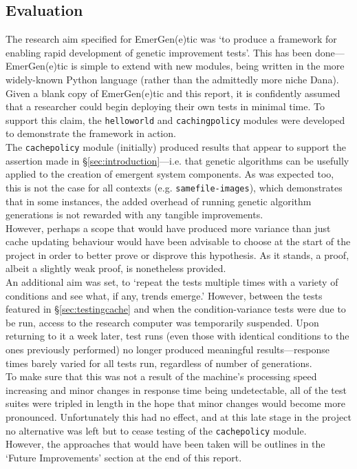 \documentclass[compsoc,12pt,a4paper]{IEEEtran}
\begin{document}
		\subsection{Evaluation}
		\label{sec:eval}
			
			The research aim specified for EmerGen(e)tic was `to produce a framework for enabling rapid development of genetic improvement tests'. This has been done---EmerGen(e)tic is simple to extend with new modules, being written in the more widely-known Python language (rather than the admittedly more niche Dana). Given a blank copy of EmerGen(e)tic and this report, it is confidently assumed that a researcher could begin deploying their own tests in minimal time. To support this claim, the \lstinline|helloworld| and \lstinline|cachingpolicy| modules were developed to demonstrate the framework in action.\\
			The \lstinline|cachepolicy| module (initially) produced results that appear to support the assertion made in \S \ref{sec:introduction}---i.e. that genetic algorithms can be usefully applied to the creation of emergent system components. As was expected too, this is not the case for all contexts (e.g. \lstinline|samefile-images|), which demonstrates that in some instances, the added overhead of running genetic algorithm generations is not rewarded with any tangible improvements.\\
			However, perhaps a scope that would have produced more variance than just cache updating behaviour would have been advisable to choose at the start of the project in order to better prove or disprove this hypothesis. As it stands, a proof, albeit a slightly weak proof, is nonetheless provided.\\
			An additional aim was set, to `repeat the tests multiple times with a variety of conditions and see what, if any, trends emerge.' However, between the tests featured in \S\ref{sec:testingcache} and when the condition-variance tests were due to be run, access to the research computer was temporarily suspended. Upon returning to it a week later, test runs (even those with identical conditions to the ones previously performed) no longer produced meaningful results---response times barely varied for all tests run, regardless of number of generations.\\
			To make sure that this was not a result of the machine's processing speed increasing and minor changes in response time being undetectable, all of the test suites were tripled in length in the hope that minor changes would become more pronounced. Unfortunately this had no effect, and at this late stage in the project no alternative was left but to cease testing of the \lstinline|cachepolicy| module.\\
			However, the approaches that would have been taken will be outlines in the `Future Improvements' section at the end of this report.
			
\end{document}
